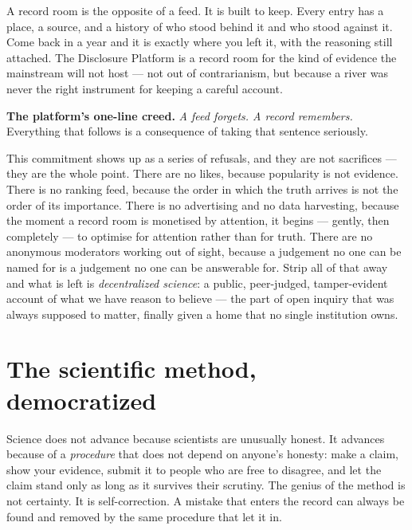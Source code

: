 \documentclass[11pt,a4paper]{article}
\begin{document}
A record room is the opposite of a feed. It is built to keep. Every entry
has a place, a source, and a history of who stood behind it and who stood
against it. Come back in a year and it is exactly where you left it, with
the reasoning still attached. The Disclosure Platform is a record room for
the kind of evidence the mainstream will not host --- not out of
contrarianism, but because a river was never the right instrument for
keeping a careful account.

\begin{notebox}
\textbf{The platform's one-line creed.} \emph{A feed forgets. A record
remembers.} Everything that follows is a consequence of taking that
sentence seriously.
\end{notebox}

This commitment shows up as a series of refusals, and they are not
sacrifices --- they are the whole point. There are no likes, because
popularity is not evidence. There is no ranking feed, because the order in
which the truth arrives is not the order of its importance. There is no
advertising and no data harvesting, because the moment a record room is
monetised by attention, it begins --- gently, then completely --- to
optimise for attention rather than for truth. There are no anonymous
moderators working out of sight, because a judgement no one can be named
for is a judgement no one can be answerable for. Strip all of that away and
what is left is \emph{decentralized science}: a public, peer-judged,
tamper-evident account of what we have reason to believe --- the part of
open inquiry that was always supposed to matter, finally given a home that
no single institution owns.

\section{The scientific method, democratized}

Science does not advance because scientists are unusually honest. It
advances because of a \emph{procedure} that does not depend on anyone's
honesty: make a claim, show your evidence, submit it to people who are free
to disagree, and let the claim stand only as long as it survives their
scrutiny. The genius of the method is not certainty. It is
self-correction. A mistake that enters the record can always be found and
removed by the same procedure that let it in.
\end{document}

